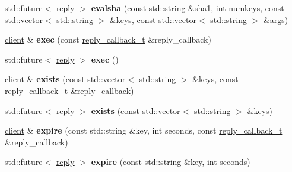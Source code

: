 \begin{DoxyCompactItemize}
\item 
\mbox{\label{classcpp__redis_1_1client_a3ab7684f292037dc3918c32549b7ad53}} 
std\+::future$<$ \hyperlink{classcpp__redis_1_1reply}{reply} $>$ {\bfseries evalsha} (const std\+::string \&sha1, int numkeys, const std\+::vector$<$ std\+::string $>$ \&keys, const std\+::vector$<$ std\+::string $>$ \&args)
\item 
\mbox{\label{classcpp__redis_1_1client_a76e78829c4ee2e1484268e465fab8997}} 
\hyperlink{classcpp__redis_1_1client}{client} \& {\bfseries exec} (const \hyperlink{classcpp__redis_1_1client_a061a1140d36d2eaeda82b09a0bb3f9f2}{reply\+\_\+callback\+\_\+t} \&reply\+\_\+callback)
\item 
\mbox{\label{classcpp__redis_1_1client_a93c5b232ae13b5107b6aa1ea5f70b70d}} 
std\+::future$<$ \hyperlink{classcpp__redis_1_1reply}{reply} $>$ {\bfseries exec} ()
\item 
\mbox{\label{classcpp__redis_1_1client_a11836c341d54a9d767cd37508bf87d73}} 
\hyperlink{classcpp__redis_1_1client}{client} \& {\bfseries exists} (const std\+::vector$<$ std\+::string $>$ \&keys, const \hyperlink{classcpp__redis_1_1client_a061a1140d36d2eaeda82b09a0bb3f9f2}{reply\+\_\+callback\+\_\+t} \&reply\+\_\+callback)
\item 
\mbox{\label{classcpp__redis_1_1client_a16ab72e15bd14a3fd2eb97194cea3d2d}} 
std\+::future$<$ \hyperlink{classcpp__redis_1_1reply}{reply} $>$ {\bfseries exists} (const std\+::vector$<$ std\+::string $>$ \&keys)
\item 
\mbox{\label{classcpp__redis_1_1client_ab2c50e9f37a4e6a5dff059c991dbd15e}} 
\hyperlink{classcpp__redis_1_1client}{client} \& {\bfseries expire} (const std\+::string \&key, int seconds, const \hyperlink{classcpp__redis_1_1client_a061a1140d36d2eaeda82b09a0bb3f9f2}{reply\+\_\+callback\+\_\+t} \&reply\+\_\+callback)
\item 
\mbox{\label{classcpp__redis_1_1client_aeb2f8b475d5adf23a25ae066e1ff45f4}} 
std\+::future$<$ \hyperlink{classcpp__redis_1_1reply}{reply} $>$ {\bfseries expire} (const std\+::string \&key, int seconds)

\end{DoxyCompactItemize}
